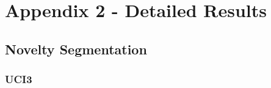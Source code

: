 
%

\chapter{Appendix 2 - Detailed Results}
\label{app:tables_detailed}

\section{Novelty Segmentation}

\subsection{UCI3}

